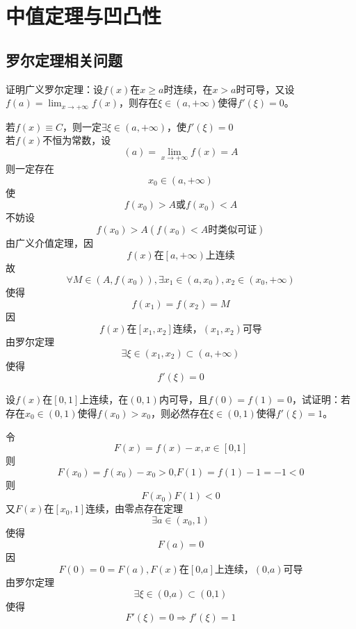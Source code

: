 \chapter{中值定理与凹凸性}
\section{罗尔定理相关问题}
\begin{example}
	\color{red}证明广义罗尔定理：设$f(x)$在$x\geqslant a$时连续，在$x>a$时可导，又设$f(a)=\lim_{x\to+\infty}f(x)$，则存在$\xi\in(a,+\infty)$使得$f'(\xi)=0$\color{black}。
\end{example}

	\begin{newproof}
			若$f\left( x \right) \equiv C$，则一定$\exists \xi \in \left( a,+\infty \right) $，使$f'\left( \xi \right) =0$\\
		若$f(x)$不恒为常数，设\[\left( a \right) =\underset{x\rightarrow +\infty}{\lim}f\left( x \right) =A\]
		则一定存在\[x_0\in \left( a,+\infty \right) \]
		使\[f\left( x_0 \right) >A\text{或}f\left( x_0 \right) <A\]
		不妨设\[ f\left( x_0 \right) >A\left( f\left( x_0 \right) <A\text{时类似可证} \right)  \]
		由广义介值定理，因\[ f\left( x \right) \text{在}\left[ a,\left. +\infty \right) \right. \text{上连续} \]
		故\[ \forall M\in \left( A,f\left( x_0 \right) \right) ,\exists x_1\in \left( a,x_0 \right) ,x_2\in \left( x_0,+\infty \right)  \]
		使得\[ f\left( x_1 \right) =f\left( x_2 \right) =M\]
		因\[ f\left( x \right) \text{在}\left[ x_1,x_2 \right] \text{连续，}\left( x_1,x_2 \right) \text{可导} \]
		由罗尔定理\[ \exists \xi \in \left( x_1,x_2 \right) \subset \left( a,+\infty \right)  \]
		使得\[ f'\left( \xi \right) =0 \]
		
	\end{newproof}

\begin{example}
	设$f(x)$在$[0,1]$上连续，在$(0,1)$内可导，且$f(0)=f(1)=0$，试证明：若存在$x_0\in(0,1)$使得$f(x_0)>x_0$，则必然存在$\xi\in(0,1)$使得$f'(\xi)=1$。
\end{example}
	\begin{newproof}
		令\[F\left( x \right) =f\left( x \right) -x,x\in \left[ \text{0,}1 \right] \]
		则\[F\left( x_0 \right) =f\left( x_0 \right) -x_0>\text{0,}F\left( 1 \right) =f\left( 1 \right) -1=-1<0\]
		则\[F\left( x_0 \right) F\left( 1 \right) <0\]
		又$F\left( x \right) \text{在}\left[ x_0,1 \right] \text{连续}$，由零点存在定理\[\exists a\in \left( x_0,1 \right) \]
		使得\[F\left( a \right) =0\]
		因\[F\left( 0 \right) =0=F\left( a \right) ,F\left( x \right) \text{在}\left[ \text{0,}a \right] \text{上连续，}\left( \text{0,}a \right) \text{可导}\]
		由罗尔定理\[\exists \xi \in \left( \text{0,}a \right) \subset \left( \text{0,}1 \right) \]
		使得\[F'\left( \xi \right) =0\Rightarrow f'\left( \xi \right) =1\]
		
	\end{newproof}

